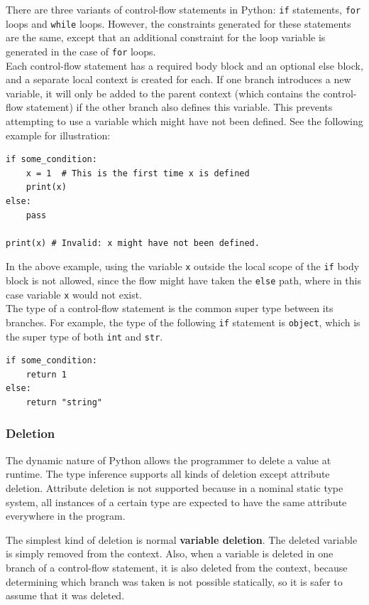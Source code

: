There are three variants of control-flow statements in Python: \lstinline|if| statements, \lstinline|for| loops and \lstinline|while| loops. However, the constraints generated for these statements are the same, except that an additional constraint for the loop variable is generated in the case of \lstinline|for| loops. \\

Each control-flow statement has a required body block and an optional else block, and a separate local context is created for each. If one branch introduces a new variable, it will only be added to the parent context (which contains the control-flow statement) if the other branch also defines this variable. This prevents attempting to use a variable which might have not been defined. See the following example for illustration:

\begin{lstlisting}
if some_condition:
	x = 1  # This is the first time x is defined
	print(x)
else:
	pass
	
print(x) # Invalid: x might have not been defined.
\end{lstlisting}
In the above example, using the variable \lstinline|x| outside the local scope of the \lstinline|if| body block is not allowed, since the flow might have taken the \lstinline|else| path, where in this case variable \lstinline|x| would not exist. \\

The type of a control-flow statement is the common super type between its branches. For example, the type of the following \lstinline|if| statement is \lstinline|object|, which is the super type of both \lstinline|int| and \lstinline|str|.

\begin{lstlisting}
if some_condition:
	return 1
else:
	return "string"
\end{lstlisting}


\subsubsection{Deletion}
The dynamic nature of Python allows the programmer to delete a value at runtime. The type inference supports all kinds of deletion except attribute deletion. Attribute deletion is not supported because in a nominal static type system, all instances of a certain type are expected to have the same attribute everywhere in the program.

The simplest kind of deletion is normal \textbf{variable deletion}. The deleted variable is simply removed from the context. Also, when a variable is deleted in one branch of a control-flow statement, it is also deleted from the context, because determining which branch was taken is not possible statically, so it is safer to assume that it was deleted.

